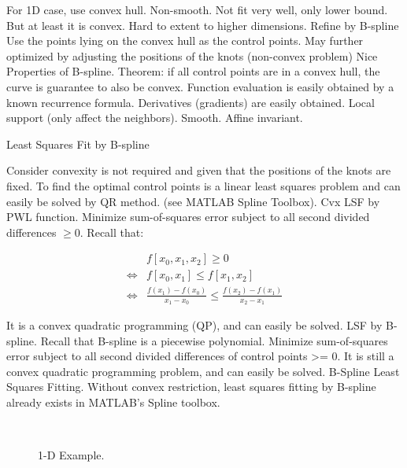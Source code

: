 \documentclass[10pt,twocolumn]{article}          %
\begin{document}
For 1D case, use convex hull. Non-smooth. Not fit very well, only
lower bound. But at least it is convex. Hard to extent to higher
dimensions. Refine by B-spline Use the points lying on the convex hull
as the control points. May further optimized by adjusting the
positions of the knots (non-convex problem) Nice Properties of
B-spline. Theorem: if all control points are in a convex hull, the
curve is guarantee to also be convex. Function evaluation is easily
obtained by a known recurrence formula. Derivatives (gradients) are
easily obtained. Local support (only affect the
neighbors). Smooth. Affine invariant. 

Least Squares Fit by B-spline

Consider convexity is not required and given that the positions of the
knots are fixed. To find the optimal control points is a linear least
squares problem and can easily be solved by QR method. (see MATLAB
Spline Toolbox). Cvx LSF by PWL function. Minimize sum-of-squares
error subject to all second divided differences $\geqslant 0$. Recall that:

\begin{align}
                & f[x_0,x_1,x_2] \geq 0 \nonumber\\
\Leftrightarrow & f[x_0,x_1] \leq f[x_1,x_2] \nonumber\\
\Leftrightarrow & \frac{f(x_1)-f(x_0)}{x_1-x_0} \leq
                  \frac{f(x_2)-f(x_1)}{x_2-x_1}\nonumber
\end{align}

It is a convex quadratic programming (QP), and can easily be
solved. LSF by B-spline. Recall that B-spline is a piecewise
polynomial. Minimize sum-of-squares error subject to all second
divided differences of control points >= 0. It is still a convex
quadratic programming problem, and can easily be solved. B-Spline
Least Squares Fitting. Without convex restriction, least squares
fitting by B-spline already exists in MATLAB's Spline toolbox. 
  \begin{figure}[ht]
    \centering
    \\
    \caption{1-D Example.}\label{fig:cvxfit1d}
  \end{figure}
\end{document}
